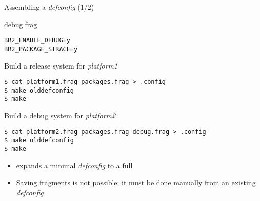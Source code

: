 \begin{frame}[fragile]{Assembling a {\em defconfig} (1/2)}

  \begin{block}{debug.frag}
    {\small
\begin{verbatim}
BR2_ENABLE_DEBUG=y
BR2_PACKAGE_STRACE=y
\end{verbatim}
    }
  \end{block}

  \begin{block}{Build a release system for {\em platform1}}
    {\small
\begin{verbatim}
$ cat platform1.frag packages.frag > .config
$ make olddefconfig
$ make
\end{verbatim}
    }
  \end{block}

  \begin{block}{Build a debug system for {\em platform2}}
    {\small
\begin{verbatim}
$ cat platform2.frag packages.frag debug.frag > .config
$ make olddefconfig
$ make
\end{verbatim}
    }
  \end{block}

  \begin{itemize}
  \item {} expands a minimal {\em defconfig} to a
    full 
  \item Saving fragments is not possible; it must be done manually
    from an existing {\em defconfig}
  \end{itemize}

\end{frame}

